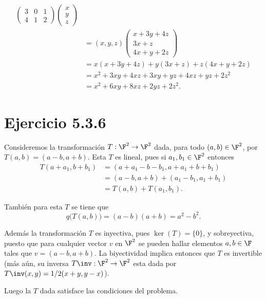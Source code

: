 \begin{sol}
\begin{align*}
\begin{pmatrix}
		3 & 0 & 1\\
		4 & 1 & 2
		\end{pmatrix}\begin{pmatrix}
		x \\ y \\ z
		\end{pmatrix} \\
		&= (x,y,z)\begin{pmatrix}
		x+3y+4z \\
		3x+z\\
		4x+y+2z
		\end{pmatrix} \\
		&= x(x+3y+4z) + y(3x+z) + z(4x+y+2z) \\
		&= x^2+3xy+4xz + 3xy + yz + 4xz + yz + 2z^2 \\
		&= x^2 +6xy+8xz+2yz+2z^2.
		\end{align*}
	\end{sol}
\section*{Ejercicio 5.3.6}
\begin{sol}
	Consideremos la transformación $T:\F^2\to\F^2$ dada, para todo $(a,b)\in\F^2$, por $T(a,b) = (a-b,a+b)$. Esta $T$ es lineal, pues si $a_1,b_1\in\F^2$ entonces
	\begin{align*}
		T(a+a_1,b+b_1) &= (a+a_1-b-b_1,a+a_1+b+b_1)\\
		 &= (a-b,a+b) + (a_1-b_1,a_1+b_1)\\
		 &= T(a,b) + T(a_1,b_1).
	\end{align*}
	
	También para esta $T$ se tiene que 
	\[ q\big(T(a,b)\big) = (a-b)(a+b) = a^2-b^2. \]
	
	Además la transformación $T$ es inyectiva, pues $\ker(T)=\{0\}$, y sobreyectiva, puesto que para cualquier vector $v$ en $\F^2$ se pueden hallar elementos $a,b\in\F$ tales que $v=(a-b,a+b)$. La biyectividad implica entonces que $T$ es invertible (más aún, su inversa $T\inv:\F^2\to\F^2$ esta dada por $T\inv(x,y) = 1/2(x+y,y-x)$).
	
	Luego la $T$ dada satisface las condiciones del problema.
\end{sol}
